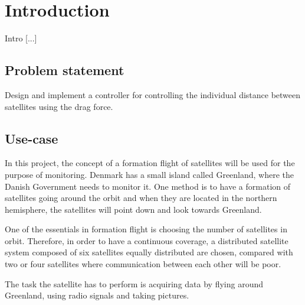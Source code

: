 \chapter{Introduction}\label{chap:Introduction}
Intro [...]

\section{Problem statement}
Design and implement a controller for controlling the individual distance between satellites using the drag force.
\section{Use-case}\label{sec:useCase}
In this project, the concept of a formation flight of satellites will be used for the purpose of monitoring. Denmark has a small island called Greenland, where the Danish Government needs to monitor it. One method is to have a formation of satellites going around the orbit and when they are located in the northern hemisphere, the satellites will point down and look towards Greenland. 

One of the essentials in formation flight is choosing the number of satellites in orbit. Therefore, in order to have a continuous coverage, a distributed satellite system composed of six satellites equally distributed are chosen, compared with two or four satellites where communication between each other will be poor.

The task the satellite has to perform is acquiring data by flying around Greenland, using radio signals and taking pictures.

